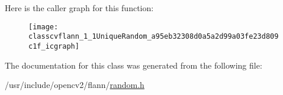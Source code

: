 Here is the caller graph for this function\-:\nopagebreak
\begin{figure}[H]
\begin{center}
\leavevmode
\texttt{[image: classcvflann\_1\_1UniqueRandom\_a95eb32308d0a5a2d99a03fe23d809c1f\_icgraph]}
\end{center}
\end{figure}




The documentation for this class was generated from the following file\-:\begin{DoxyCompactItemize}
\item 
/usr/include/opencv2/flann/\hyperlink{random_8h}{random.\-h}\end{DoxyCompactItemize}
